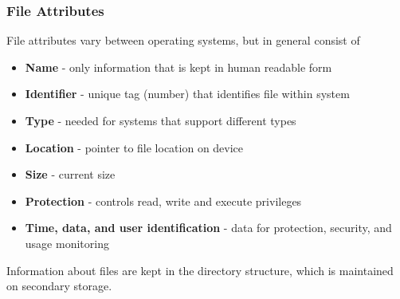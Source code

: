 \documentclass{book/custombook}
\begin{document}
                \subsubsection{File Attributes}
                    File attributes vary between operating systems, but in general consist of 
                    \begin{itemize}
                        \item \textbf{Name} - only information that is kept in human readable form
                        \item \textbf{Identifier} - unique tag (number) that identifies file within system
                        \item \textbf{Type} - needed for systems that support different types
                        \item \textbf{Location} - pointer to file location on device
                        \item \textbf{Size} - current size
                        \item \textbf{Protection} - controls read, write and execute privileges
                        \item \textbf{Time, data, and user identification} - data for protection, security, and usage monitoring
                    \end{itemize}
                    Information about files are kept in the directory structure, which is maintained on secondary storage.
\end{document}
